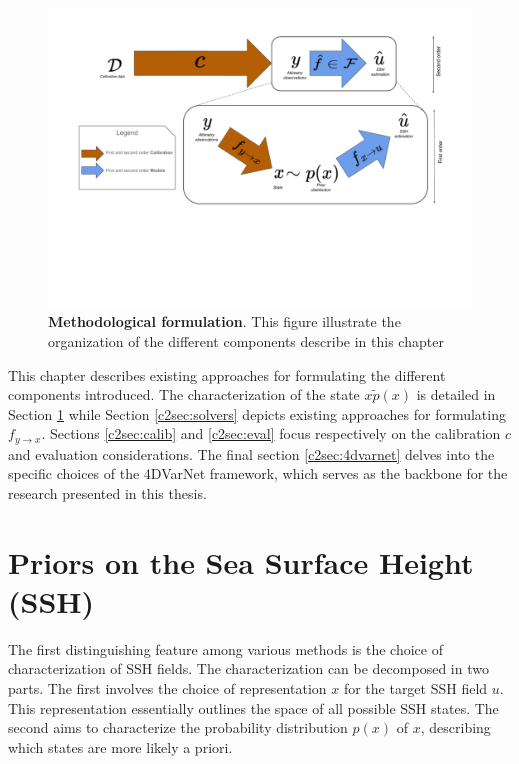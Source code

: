 \begin{bibunit}
\begin{figure}[h]
    \centering
    \includegraphics[width=\textwidth, clip,trim=0 5cm 0 0]{00_LitReview/Method-highlevel.pdf}
    \caption{\textbf{Methodological formulation}. This figure illustrate the organization of the different components describe in this chapter}
    \label{c2fig:methodhl}
\end{figure}

  This chapter describes existing approaches for formulating the different components introduced. The characterization of the state $x \tilde p(x)$ is detailed in Section \ref{c2sec:prior} while Section \ref{c2sec:solvers}  depicts existing approaches for formulating $f_{y\to x}$. Sections \ref{c2sec:calib} and \ref{c2sec:eval} focus respectively on the calibration $c$ and evaluation considerations.
  The final section \ref{c2sec:4dvarnet} delves into the specific choices of the 4DVarNet framework, which serves as the backbone for the research presented in this thesis.





 \section{Priors on the Sea Surface Height (SSH)}
  \label{c2sec:prior}
The first distinguishing feature among various methods is the choice of characterization of SSH fields. The characterization can be decomposed in two parts.
The first involves the choice of representation $x$ for the target SSH field $u$. This representation essentially outlines the space of all possible SSH states.
The second aims to characterize the probability distribution $p(x)$ of $x$, describing which states are more likely a priori.




\end{bibunit}
